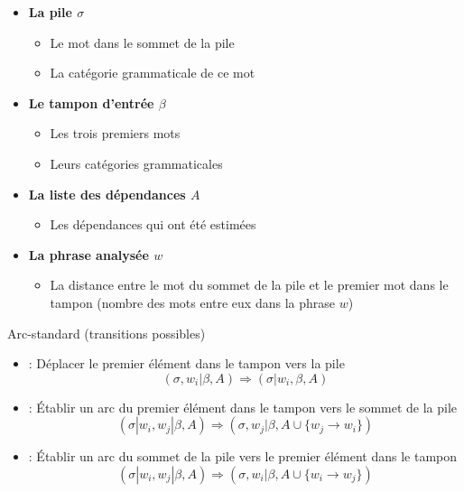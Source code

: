 \documentclass{KodeBook}
\begin{document}
\begin{itemize}
	\item \textbf{La pile $\sigma$}
	\begin{itemize}
		\item Le mot dans le sommet de la pile
		\item La catégorie grammaticale de ce mot
	\end{itemize}
	
	\item \textbf{Le tampon d'entrée $\beta$}
	\begin{itemize}
		\item Les trois premiers mots
		\item Leurs catégories grammaticales
	\end{itemize}
	
	\item \textbf{La liste des dépendances $A$}
	\begin{itemize}
		\item Les dépendances qui ont été estimées
	\end{itemize}
	
	\item \textbf{La phrase analysée $w$}
	\begin{itemize}
		\item La distance entre le mot du sommet de la pile et le premier mot dans le tampon (nombre des mots entre eux dans la phrase $w$)
	\end{itemize}
	
\end{itemize}

Arc-standard (transitions possibles)
\begin{itemize}
	\item {} : Déplacer le premier élément dans le tampon vers la pile 
	\[ (\sigma, w_i|\beta, A) \Rightarrow  (\sigma|w_i, \beta, A) \]
	
	\item {} : Établir un arc du premier élément dans le tampon vers le sommet de la pile
	\[ (\sigma|w_i, w_j|\beta, A) \Rightarrow  (\sigma, w_j|\beta, A \cup \{w_j \rightarrow w_i \}) \] 
	
	\item {} : Établir un arc du sommet de la pile vers le premier élément dans le tampon
	\[ (\sigma|w_i, w_j|\beta, A) \Rightarrow  (\sigma, w_i|\beta, A \cup \{w_i \rightarrow w_j \}) \] 
\end{itemize}
\end{document}
